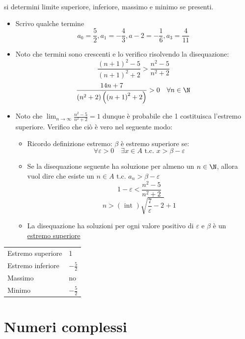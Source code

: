 si determini limite superiore, inferiore, massimo e minimo se presenti.
\begin{itemize}
	\item Scrivo qualche termine
	      \[
		      a_0 = \frac{5}{2}, a_1 = - \frac{4}{3} , a-2 = -\frac{1}{6}, a_3 =\frac{4}{11}
	      \]
	\item Noto che termini sono crescenti e lo verifico risolvendo la disequazione: \[
		      \frac{\left( n+1 \right) ^2 -5}{\left( n+1 \right) ^2 + 2} > \frac{n^2 -5 }{n^2 +2}
	      \]
	      \[
		      \frac{14n + 7}{\left( n^2 + 2 \right) \left( \left( n+1 \right) ^2 +2  \right) } > 0 \quad \forall n  \in  \N
	      \]
	\item Noto che $\lim_{n \to \infty} \frac{n^2 -5}{n^2 + 2} = 1 $ dunque è probabile che 1 costituisca l'estremo superiore. Verifico che ciò è vero nel seguente modo:
	      \begin{itemize}
		      \item Ricordo definizione estremo: $\beta$ è estremo superiore se:
		            \[
			            \forall \varepsilon > 0 \quad  \exists x  \in A \text{ t.c. } x > \beta - \varepsilon
		            \]
		      \item Se la disequazione seguente ha soluzione per almeno un $n  \in  \N$, allora vuol dire che esiste un $ n  \in  A \text{ t.c. } a_n > \beta - \varepsilon$
		            \[
			            1-\varepsilon < \frac{n^2 -5}{n^2 + 2}
		            \]
		            \[
			            n > \left( \text{ int } \right) \sqrt{\frac{7}{\varepsilon}-2} +1
		            \]
		      \item La disequazione ha soluzioni per ogni valore positivo di $\varepsilon$ e  $\beta $ è un \underline{estremo superiore}
	      \end{itemize}
\end{itemize}
\begin{table}[h!]
	\centering
	\begin{tabular}{|ll|}
		\hline
		Estremo superiore & 1              \\
		Estremo inferiore & $-\frac{5}{2}$ \\
		Massimo           & no             \\
		Minimo            & $-\frac{5}{2}$ \\
		\hline
	\end{tabular}
\end{table}
\section{Numeri complessi}
